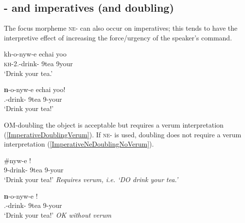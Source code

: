 \documentclass[output=paper]{langscibook}
\begin{document}

\subsection{\Ne{}- and imperatives (and doubling)}

The focus morpheme \textsc{ne}- can also occur on imperatives; this tends to have the interpretive effect of increasing the force/urgency of the speaker's command. 

\begin{exe}
\ex 
\begin{xlist}


\ex 
\gll kh-o-nyw-e echai yoo   \\
\textsc{kh}-2\Sg.\Sm-drink-\Subj{} 9tea 9your \\
\glt `Drink your tea.' 

\ex 
\gll \textbf{n}-o-nyw-e echai yoo! \\
\Sg.\Sm-drink-\Subj{} 9tea 9-your \\
\glt `Drink your tea!'

\end{xlist}
\end{exe}


OM-doubling the object is acceptable but requires a verum interpretation (\ref{ImperativeDoublingVerum}). If \textsc{ne}- is used, doubling does not require a verum interpretation (\ref{ImperativeNeDoublingNoVerum}).

\begin{exe}
\ex 
\begin{xlist}

\ex \label{ImperativeDoublingVerum}
\gll \#nyw-e !  \\
9\Om-drink-\Subj{} {9tea \hspace{2mm} 9-your} \\
\glt `Drink your tea!' \textit{Requires verum, i.e. `DO drink your tea.'}

\ex \label{ImperativeNeDoublingNoVerum}
\gll \textbf{n}-o-nyw-e ! \\
\Sg.\Om-drink-\Subj{} {9tea \hspace{2mm} 9-your} \\
\glt `Drink your tea!' \textit{OK without verum}

\end{xlist}
\end{exe}
\end{document}
